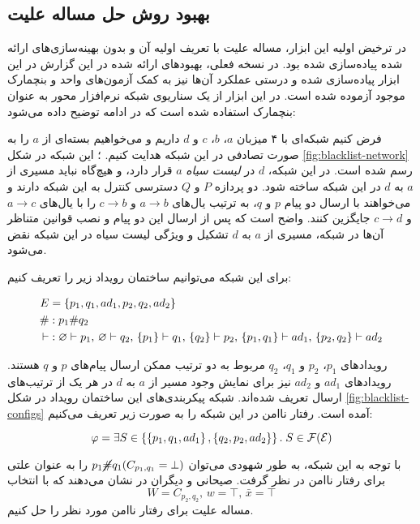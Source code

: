 \subsection{بهبود روش حل مساله علیت}

در ترخیض اولیه این ابزار، مساله علیت با تعریف اولیه آن
و بدون بهینه‌سازی‌های ارائه شده پیاده‌سازی شده بود.
در نسخه فعلی، بهبودهای ارائه شده در این گزارش
در این ابزار پیاده‌سازی شده
و درستی عملکرد آن‌ها نیز به کمک آزمون‌های واحد و بنچمارک
موجود آزموده شده است.
در این ابزار از یک سناریوی شبکه نرم‌افزار محور
به عنوان بنچمارک استفاده شده است
که در ادامه توضیح داده می‌شود:



فرض کنیم شبکه‌ای با ۴ میزبان
$a$، $b$، $c$ و $d$
داریم و می‌خواهیم بسته‌ای از
$a$
را به صورت تصادفی در این شبکه
هدایت کنیم.
؛ این شبکه در شکل
\ref{fig:blacklist-network}
رسم شده است. در این شبکه،
$d$
در \textit{لیست سیاه}
$a$
قرار دارد، و هیچ‌گاه نباید مسیری از
$a$ به $d$
در این شبکه ساخته شود.
دو پردازه
$P$ و $Q$
دسترسی کنترل به این شبکه دارند و
می‌خواهند با ارسال دو پیام
$p$ و $q$،
به ترتیب یال‌های
$a \to b$ و $c \to b$
را با یال‌های
$a \to c$ و $c \to d$
جایگزین کنند.
واضح است که پس از ارسال این دو پیام
و نصب قوانین متناظر آن‌ها در شبکه،
مسیری از 
$a$ به $d$
تشکیل و ویژگی لیست سیاه در این شبکه نقض می‌شود.

برای این شبکه می‌توانیم ساختمان رویداد زیر را تعریف کنیم:

\begin{align*}
  E & = \left\{ p_1,q_1,ad_1,p_2,q_2,ad_2 \right\} \\ 
  \# & : p_1 \# q_2 \\
  \vdash & :
    \varnothing \vdash p_1,\,
    \varnothing \vdash q_2,\,
    \left\{ p_1 \right\} \vdash q_1,\,
    \left\{ q_2 \right\} \vdash p_2,\,
    \left\{ p_1,q_1 \right\} \vdash ad_1,\,
    \left\{ p_2,q_2 \right\} \vdash ad_2
\end{align*}

رویدادهای
$p_1$، $p_2$ و 
$q_1$، $q_2$
مربوط به دو ترتیب ممکن ارسال پیام‌های
$p$ و $q$
هستند. رویدادهای
$ad_1$ و $ad_2$
نیز برای نمایش وجود مسیر از
$a$ به $d$
در هر یک از ترتیب‌های ارسال تعریف شده‌اند.
شبکه پیکربندی‌های این ساختمان رویداد در شکل
\ref{fig:blacklist-configs}
آمده است. رفتار ناامن در این شبکه را به صورت زیر تعریف می‌کنیم:

\[ \varphi = \exists S
  \in \left\{ 
    \left\{ p_1,q_1,ad_1 \right\},
    \left\{ q_2,p_2,ad_2 \right\}
   \right\}.\;
  S \in \operatorname{\mathcal{F}}(\mathcal{E})
\]

با توجه به این شبکه، به طور شهودی می‌توان
$p_1 \cancel{\#} q_1 (C_{p_1,q_1}=\bot)$
را به عنوان علتی برای رفتار ناامن در نظر گرفت.
صیحانی و دیگران در
\cite{seyhani2022}
نشان می‌دهند که با انتخاب
\[ W=C_{p_2,q_2},\,w=\top,\,\bar{x}=\top \]
مساله علیت برای رفتار ناامن مورد نظر را حل کنیم.

